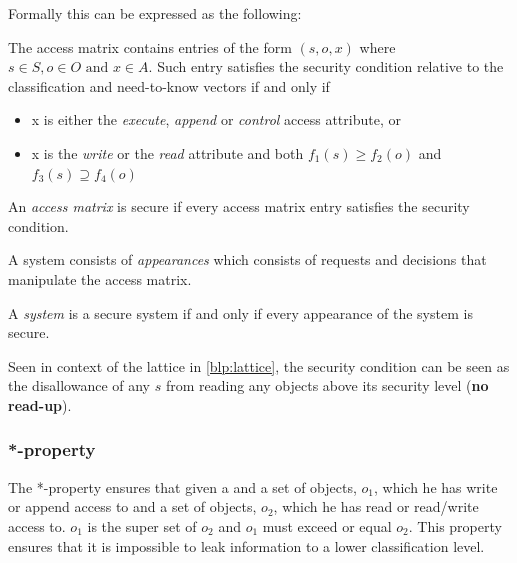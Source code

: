 Formally this can be expressed as the following:
\begin{definition}
The access matrix contains entries of the form $(s,o,x)$ where $s \in S, o \in O \text{ and } x \in A$.
Such entry satisfies the security condition relative to the classification and need-to-know vectors if and only if

\begin{itemize}
\item x is either the \emph{execute}, \emph{append} or \emph{control} access attribute, or
\item x is the \emph{write} or the \emph{read} attribute and both $f_1(s) \ge f_2(o)$ and $f_3(s) \supseteq f_4(o)$
\end{itemize}

An \emph{access matrix} is secure if every access matrix entry satisfies the security condition.

A system consists of \emph{appearances} which consists of requests and decisions that manipulate the access matrix.

A \emph{system} is a secure system if and only if every appearance of the system is secure.
\end{definition}

Seen in context of the lattice in \cref{blp:lattice}, the security condition can be seen as the disallowance of any \ssubject{} $s$ from reading any objects above its security level (\textbf{no read-up}).

\subsubsection{*-property}
The *-property ensures that given a \principal{} and a set of objects, $o_1$, which he has write or append access to and a set of objects, $o_2$, which he has read or read/write access to.
$o_1$ is the super set of $o_2$ and $o_1$ must exceed or equal $o_2$.
This property ensures that it is impossible to leak information to a lower classification level.

